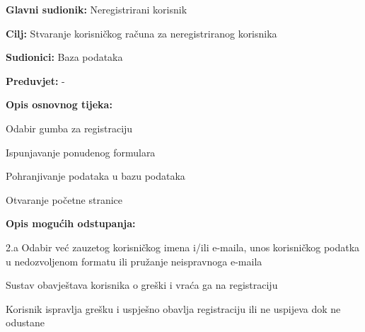 \documentclass{article}
\begin{document}
		\begin{packed_item}
			
			\item \textbf{Glavni sudionik: }Neregistrirani korisnik
			\item  \textbf{Cilj:} Stvaranje korisničkog računa za neregistriranog korisnika
			\item  \textbf{Sudionici:} Baza podataka
			\item  \textbf{Preduvjet:} -
			\item  \textbf{Opis osnovnog tijeka:}
			
			\item[] \begin{packed_enum}
				\item Odabir gumba za registraciju
				\item Ispunjavanje ponudenog formulara
				\item Pohranjivanje podataka u bazu podataka
				\item Otvaranje početne stranice 
			\end{packed_enum}
			
			\item  \textbf{Opis mogućih odstupanja:}
			
			\item[] \begin{packed_item}
				
				\item[2.a] Odabir već zauzetog korisničkog imena i/ili e-maila, unos korisničkog podatka u nedozvoljenom formatu ili pružanje neispravnoga e-maila
				\item[] \begin{packed_enum}
					\item Sustav obavještava korisnika o greški i vraća ga na registraciju 
					\item Korisnik ispravlja grešku i uspješno obavlja registraciju ili ne uspijeva dok ne odustane
				\end{packed_enum}
			\end{packed_item}
		\end{packed_item}
	
\end{document}
